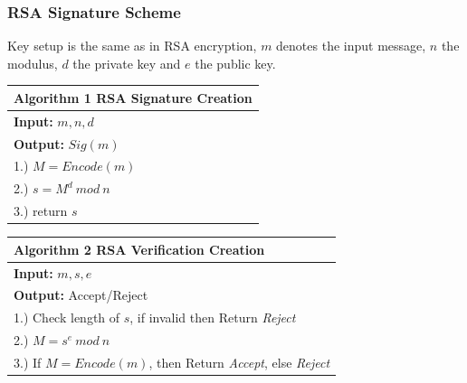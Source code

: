 \documentclass[a4paper, 10 pt, conference]{ieeeconf}
\begin{document}
\vspace{0.5cm}
\subsubsection{\textbf{RSA Signature Scheme}}
Key setup is the same as in RSA encryption, $m$ denotes the input message, $n$ the modulus, $d$ the private key and $e$ the public key.\\
\begin{table}[h!]
  \begin{center}
    \begin{tabularx}{\columnwidth}{ l   }
    \toprule
    \textbf{Algorithm 1} RSA Signature Creation \\ \midrule
    \textbf{Input:} $m,n,d$ \\ 
    \textbf{Output:} $Sig(m)$ \\
 1.) $M = Encode (m)$ \\
 2.) $s = M^{d} \ mod \ n$ \\
 3.) return $s$ \\

    \bottomrule
    \end{tabularx}
  \end{center}
\end{table}

\pagebreak
\begin{table}[h!]
  \begin{center}
    \begin{tabularx}{\columnwidth}{ l   }
    \toprule
    \textbf{Algorithm 2} RSA Verification Creation \\ \midrule
    \textbf{Input:} $m,s,e$ \\ 
    \textbf{Output:} Accept/Reject \\
    1.) Check length of $s$, if invalid then Return \emph{Reject} \\
    2.) $M = s^{e} \ mod \ n$ \\
    3.) If $M=Encode(m)$, then Return \emph{Accept}, else \emph{Reject} \\
    \bottomrule
    \end{tabularx}
  \end{center}
\end{table}


\vspace{0.5cm}
\end{document}
